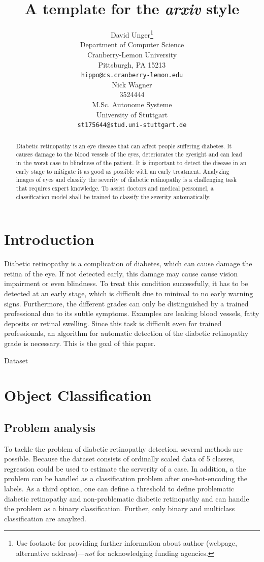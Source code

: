\documentclass{article}
\title{A template for the \emph{arxiv} style}
\author{
  David Unger\thanks{Use footnote for providing further
    information about author (webpage, alternative
    address)---\emph{not} for acknowledging funding agencies.} \\
  Department of Computer Science\\
  Cranberry-Lemon University\\
  Pittsburgh, PA 15213 \\
  \texttt{hippo@cs.cranberry-lemon.edu} \\
   \And
  Nick Wagner\\
  3524444 \\
  M.Sc. Autonome Systeme\\
  University of Stuttgart\\
  \texttt{st175644@stud.uni-stuttgart.de} \\
}
\begin{document}
\maketitle

\begin{abstract}
Diabetic retinopathy is an eye disease that can affect people suffering diabetes. It causes damage to the blood vessels of 
the eyes, deteriorates the eyesight and can lead in the worst case to blindness of the patient. It is important to 
detect the disease in an early stage to mitigate it as good as possible with an early treatment. Analyzing images of 
eyes and classify the severity of diabetic retinopathy is a challenging task that requires expert knowledge. To assist 
doctors and medical personnel, a classification model shall be trained to classify the severity automatically. 
\end{abstract}

\section{Introduction}
Diabetic retinopathy is a complication of diabetes, which can cause damage the retina of the eye. 
If not detected early, this damage may cause cause vision impairment or even blindness. 
To treat this condition successfully, it has to be detected at an early stage, which is difficult due to minimal to no early warning signs. 
Furthermore, the different grades can only be distinguished by a trained professional due to its subtle symptoms.
Examples are leaking blood vessels, fatty deposits or retinal swelling.
Since this task is difficult even for trained professionals, an algorithm for automatic detection of the diabetic retinopathy grade is necessary.
This is the goal of this paper. 


Dataset
\section{Object Classification}
\subsection{Problem analysis}

To tackle the problem of diabetic retinopathy detection, several methods are possible. Because the dataset consists of 
ordinally scaled data of 5 classes, regression could be used to estimate the serverity of a case. In addition, a the problem 
can be handled as a classification problem after one-hot-encoding the labels. As a third option, one can define a threshold 
to define problematic diabetic retinopathy and non-problematic diabetic retinopathy and can handle the problem as a binary 
classification. Further, only binary and multiclass classification are anaylzed.
\end{document}
